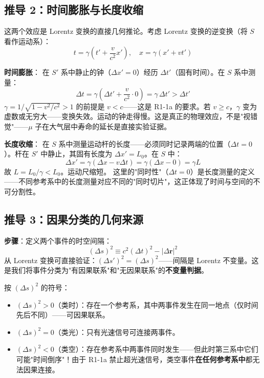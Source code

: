 \subsection{推导 2：时间膨胀与长度收缩}

这两个效应是 Lorentz 变换的直接几何推论。考虑 Lorentz 变换的逆变换（将 $S$ 看作运动系）：
\begin{equation}
t = \gamma\left(t' + \frac{v}{c^2}x'\right), \quad x = \gamma(x' + vt')
\end{equation}

\textbf{时间膨胀}：\fbox{[S]} 在 $S'$ 系中静止的钟（$\Delta x' = 0$）经历 $\Delta t'$（固有时间）。在 $S$ 系中测量：
\begin{equation}
\Delta t = \gamma\left(\Delta t' + \frac{v}{c^2} \cdot 0\right) = \gamma\, \Delta t' > \Delta t'
\end{equation}
\fbox{[N]} $\gamma = 1/\sqrt{1-v^2/c^2} > 1$ 的前提是 $v < c$——这是 R1-1a 的要求。若 $v \ge c$，$\gamma$ 变为虚数或无穷大——变换失效。运动的钟走得慢。这是真正的物理效应，不是"视错觉"——$\mu$ 子在大气层中寿命的延长是直接实验证据。

\textbf{长度收缩}：\fbox{[S]} 在 $S$ 系中测量运动杆的长度——必须同时记录两端的位置（$\Delta t = 0$）。杆在 $S'$ 中静止，其固有长度为 $\Delta x' = L_0$。在 $S$ 中：
\begin{equation}
\Delta x' = \gamma(\Delta x - v\Delta t) = \gamma(\Delta x - 0) = \gamma L
\end{equation}
故 $L = L_0/\gamma < L_0$。运动尺缩短。\fbox{[N]} 这里的"同时性"（$\Delta t = 0$）是长度测量的定义——不同参考系中的长度测量对应不同的"同时切片"，这正体现了时间与空间的不可分割性。

\subsection{推导 3：因果分类的几何来源}

\textbf{步骤}：定义两个事件的时空间隔：
\begin{equation}
(\Delta s)^2 \equiv c^2(\Delta t)^2 - |\Delta\mathbf{r}|^2
\end{equation}
\fbox{[S]} 从 Lorentz 变换可直接验证：$(\Delta s')^2 = (\Delta s)^2$——间隔是 Lorentz 不变量。这是我们将事件分类为"有因果联系"和"无因果联系"的\textbf{不变量判据}。

按 $(\Delta s)^2$ 的符号：
\begin{itemize}
\item $(\Delta s)^2 > 0$（类时）：存在一个参考系，其中两事件发生在同一地点（仅时间先后不同）\fbox{[S]}——可因果联系。
\item $(\Delta s)^2 = 0$（类光）：只有光速信号可连接两事件\fbox{[S]}。
\item $(\Delta s)^2 < 0$（类空）：存在参考系中两事件同时发生\fbox{[S]}——但此时第三系中它们可能"时间倒序"！由于 R1-1a 禁止超光速信号，类空事件\textbf{在任何参考系中}都无法因果连接。
\end{itemize}

